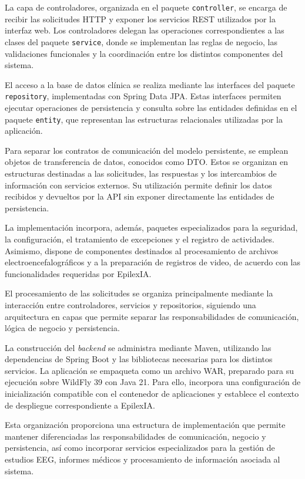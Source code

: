 La capa de controladores, organizada en el paquete
\texttt{controller}, se encarga de recibir las
solicitudes HTTP y exponer los servicios REST
utilizados por la interfaz web. Los controladores
delegan las operaciones correspondientes a las
clases del paquete \texttt{service}, donde se
implementan las reglas de negocio, las validaciones
funcionales y la coordinación entre los distintos
componentes del sistema.

El acceso a la base de datos clínica se realiza
mediante las interfaces del paquete
\texttt{repository}, implementadas con Spring Data
JPA. Estas interfaces permiten ejecutar operaciones
de persistencia y consulta sobre las entidades
definidas en el paquete \texttt{entity}, que
representan las estructuras relacionales utilizadas
por la aplicación.

Para separar los contratos de comunicación del
modelo persistente, se emplean objetos de
transferencia de datos, conocidos como DTO.
Estos se organizan en estructuras destinadas
a las solicitudes, las respuestas y los
intercambios de información con servicios
externos. Su utilización permite definir
los datos recibidos y devueltos por la API
sin exponer directamente las entidades de
persistencia.

La implementación incorpora, además, paquetes
especializados para la seguridad, la configuración,
el tratamiento de excepciones y el registro de
actividades. Asimismo, dispone de componentes
destinados al procesamiento de archivos
electroencefalográficos y a la preparación
de registros de video, de acuerdo con las
funcionalidades requeridas por EpilexIA.


El procesamiento de las solicitudes se organiza
principalmente mediante la interacción entre controladores,
servicios y repositorios, siguiendo una arquitectura
en capas que permite separar las responsabilidades
de comunicación, lógica de negocio y persistencia.


La construcción del \textit{backend} se administra
mediante Maven, utilizando las dependencias
de Spring Boot y las bibliotecas necesarias
para los distintos servicios. La aplicación
se empaqueta como un archivo WAR, preparado
para su ejecución sobre WildFly 39 con Java 21.
Para ello, incorpora una configuración de
inicialización compatible con el contenedor
de aplicaciones y establece el contexto
de despliegue correspondiente a EpilexIA.

Esta organización proporciona una estructura
de implementación que permite mantener
diferenciadas las responsabilidades de
comunicación, negocio y persistencia, así
como incorporar servicios especializados
para la gestión de estudios EEG, informes
médicos y procesamiento de información
asociada al sistema.


